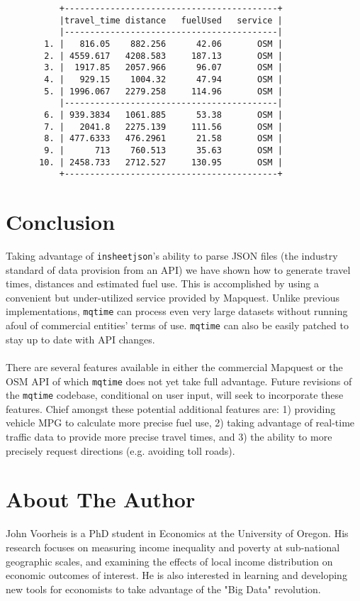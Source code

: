 \documentclass[12pt]{article}
\begin{document}
\begin{figure}[ht]
\begin{center}
{\footnotesize
\begin{verbatim}
     +------------------------------------------+
     |travel_time distance   fuelUsed   service |
     |------------------------------------------|
  1. |   816.05    882.256      42.06       OSM |
  2. | 4559.617   4208.583     187.13       OSM |
  3. |  1917.85   2057.966      96.07       OSM |
  4. |   929.15    1004.32      47.94       OSM |
  5. | 1996.067   2279.258     114.96       OSM |
     |------------------------------------------|
  6. | 939.3834   1061.885      53.38       OSM |
  7. |   2041.8   2275.139     111.56       OSM |
  8. | 477.6333   476.2961      21.58       OSM |
  9. |      713    760.513      35.63       OSM |
 10. | 2458.733   2712.527     130.95       OSM |
     +------------------------------------------+
\end{verbatim}
}
\end{center}
\end{figure}

\section{Conclusion}
Taking advantage of \verb|insheetjson|'s ability to parse JSON files (the industry standard of data provision from an API) we have shown how to generate travel times, distances and estimated fuel use. This is accomplished by using a convenient but under-utilized service provided by Mapquest. Unlike previous implementations, \verb|mqtime| can process even very large datasets without running afoul of commercial entities' terms of use. \verb|mqtime| can also be easily patched to stay up to date with API changes. 
\\ \\
There are several features available in either the commercial Mapquest or the OSM API of which \verb|mqtime| does not yet take full advantage. Future revisions of the \verb|mqtime| codebase, conditional on user input, will seek to incorporate these features. Chief amongst these potential additional features are: 1) providing vehicle MPG to calculate more precise fuel use, 2) taking advantage of real-time traffic data to provide more precise travel times, and 3) the ability to more precisely request directions (e.g. avoiding toll roads).



\nocite{Ozimek2011, Traveltime3, MapquestTOU, OSMTOU}

\section*{About The Author}
John Voorheis is a PhD student in Economics at the University of Oregon. His research focuses on measuring income inequality and poverty at sub-national geographic scales, and examining the effects of local income distribution on economic outcomes of interest. He is also interested in learning and developing new tools for economists to take advantage of the "Big Data" revolution.
\end{document}
